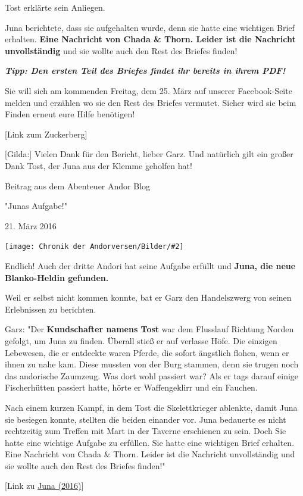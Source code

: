 \documentclass[10pt, a4paper, oneside]{book}
\newcommand{\refprodukt}[1]{\hyperref[Produkt: #1]{#1}}
\newcommand{\bildmitts}[2][height=0.32\textwidth,width=0.48\textwidth,keepaspectratio]{%
    \begin{center}
        \texttt{[image: Chronik der Andorversen/Bilder/\#2]}
    \end{center}
}
\begin{document}
\begin{multicols}{2}
Tost erklärte sein Anliegen.

Juna berichtete, dass sie aufgehalten wurde, denn sie hatte eine wichtigen Brief erhalten. \textbf{Eine Nachricht von Chada \& Thorn. Leider ist die Nachricht unvollständig} und sie wollte auch den Rest des Briefes finden!

\textit{\textbf{Tipp: Den ersten Teil des Briefes findet ihr bereits in ihrem PDF!}}

Sie will sich am kommenden Freitag, dem 25. März auf unserer Facebook-Seite melden und erzählen wo sie den Rest des Briefes vermutet. Sicher wird sie beim Finden erneut eure Hilfe benötigen!

[Link zum Zuckerberg]

[Gilda:] Vielen Dank für den Bericht, lieber Garz. Und natürlich gilt ein großer Dank Tost, der Juna aus der Klemme geholfen hat!


\begin{center}
    Beitrag aus dem Abenteuer Andor Blog

    "Junas Aufgabe!"

    21. März 2016
\end{center}

\bildmitts{AA2016 Blog 4.jpeg}

Endlich! Auch der dritte Andori hat seine Aufgabe erfüllt und \textbf{Juna, die neue Blanko-Heldin gefunden.}

Weil er selbst nicht kommen konnte, bat er Garz den Handelszwerg von seinen Erlebnissen zu berichten.

Garz: "Der \textbf{Kundschafter namens Tost} war dem Flusslauf Richtung Norden gefolgt, um Juna zu finden. Überall stieß er auf verlasse Höfe. Die einzigen Lebewesen, die er entdeckte waren Pferde, die sofort ängstlich flohen, wenn er ihnen zu nahe kam. Diese mussten von der Burg stammen, denn sie trugen noch das andorische Zaumzeug. Was dort wohl passiert war? Als er tags darauf einige Fischerhütten passiert hatte, hörte er Waffengeklirr und ein Fauchen.

Nach einem kurzen Kampf, in dem Tost die Skelettkrieger ablenkte, damit Juna sie besiegen konnte, stellten die beiden einander vor. Juna bedauerte es nicht rechtzeitig zum Treffen mit Mart in der Taverne erschienen zu sein. Doch Sie hatte eine wichtige Aufgabe zu erfüllen. Sie hatte eine wichtigen Brief erhalten. Eine Nachricht von Chada \& Thorn. Leider ist die Nachricht unvollständig und sie wollte auch den Rest des Briefes finden!"

[Link zu \refprodukt{Juna (2016)}]


\end{multicols}
\end{document}

